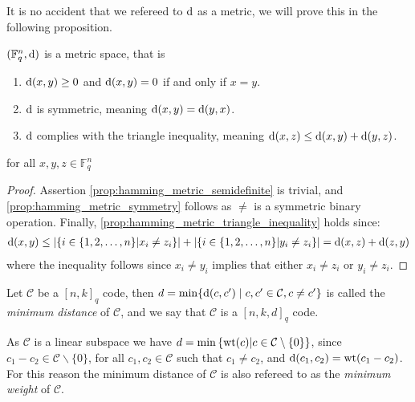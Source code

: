 It is no accident that we refereed to $\mathrm{d}$ as a metric, we will prove this in the following proposition.
\begin{proposition}\label{prop:hamming_metric}
  $(\mathbb{F}_{q}^{n}, \mathrm{d})$ is a metric space, that is
  \begin{enumerate}
    \item $\mathrm{d}(x, y) \geq 0$ and $\mathrm{d}(x, y) = 0$ if and only if $x = y$. \label{prop:hamming_metric_semidefinite}
    \item $\mathrm{d}$ is symmetric, meaning $\mathrm{d}(x, y) = \mathrm{d}(y, x)$. \label{prop:hamming_metric_symmetry}
    \item $\mathrm{d}$ complies with the triangle inequality, meaning $\mathrm{d}(x, z) \leq \mathrm{d}(x, y) + \mathrm{d}(y, z)$. \label{prop:hamming_metric_triangle_inequality}
  \end{enumerate}
  for all $x, y, z \in \mathbb{F}_{q}^{n}$
\end{proposition}
\begin{proof}
  Assertion \ref{prop:hamming_metric_semidefinite} is trivial, and \ref{prop:hamming_metric_symmetry} follows as $\not =$ is a symmetric binary operation. Finally, \ref{prop:hamming_metric_triangle_inequality} holds since:
  \begin{align*}
    \mathrm{d}(x, y) \leq\left\lvert\{i \in \left\{1,2, \ldots, n\right\} \middle| x_{i} \neq z_{i}\}\right\rvert + \left\lvert\{i \in \left\{1,2, \ldots, n\right\} \middle| y_{i} \neq z_{i}\}\right\rvert = \mathrm{d}(x, z) + \mathrm{d}(z, y)
  \end{align*}
  where the inequality follows since $x_{i} \neq y_{i}$ implies that either $x_{i} \neq z_{i}$ or $y_{i} \neq z_{i}$.
\end{proof}
\begin{definition}
  Let $\mathcal{C}$ be a $[n, k]_q$ code, then $d = \min\{\mathrm{d}(c, c') \mid c, c' \in \mathcal{C}, c \neq c'\}$ is called the \textit{minimum distance} of $\mathcal{C}$, and we say that $\mathcal{C}$ is a $[n,k,d]_q$ code.
\end{definition}

\begin{remark}\label{rem:min_dist_is_the_same_as_min_weight}
  As $\mathcal{C}$ is a linear subspace we have $d=\min\left\{\mathrm{wt}(c) \middle| c \in \mathcal{C} \setminus \left\{0\right\}\right\}$, since $c_{1} - c_{2} \in \mathcal{C} \backslash \{0\}$, for all $c_{1}, c_{2} \in \mathcal{C}$ such that $c_{1} \neq c_{2}$, and $\mathrm{d}(c_{1}, c_{2}) = \mathrm{wt}(c_{1} - c_{2})$. For this reason the minimum distance of $\mathcal{C}$ is also refereed to as the \textit{minimum weight} of $\mathcal{C}$.
\end{remark}

